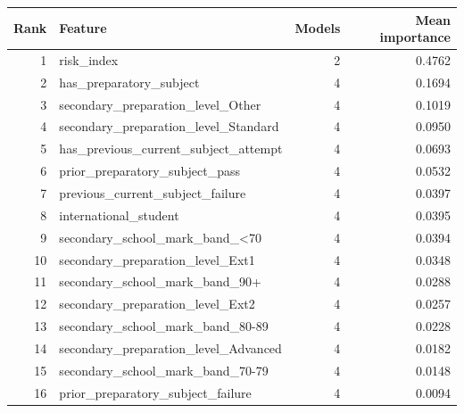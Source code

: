 \begin{tabular}{rlrr}
\toprule
Rank & Feature & Models & Mean importance \\
\midrule
1 & risk\_index & 2 & 0.4762 \\
2 & has\_preparatory\_subject & 4 & 0.1694 \\
3 & secondary\_preparation\_level\_Other & 4 & 0.1019 \\
4 & secondary\_preparation\_level\_Standard & 4 & 0.0950 \\
5 & has\_previous\_current\_subject\_attempt & 4 & 0.0693 \\
6 & prior\_preparatory\_subject\_pass & 4 & 0.0532 \\
7 & previous\_current\_subject\_failure & 4 & 0.0397 \\
8 & international\_student & 4 & 0.0395 \\
9 & secondary\_school\_mark\_band\_<70 & 4 & 0.0394 \\
10 & secondary\_preparation\_level\_Ext1 & 4 & 0.0348 \\
11 & secondary\_school\_mark\_band\_90+ & 4 & 0.0288 \\
12 & secondary\_preparation\_level\_Ext2 & 4 & 0.0257 \\
13 & secondary\_school\_mark\_band\_80-89 & 4 & 0.0228 \\
14 & secondary\_preparation\_level\_Advanced & 4 & 0.0182 \\
15 & secondary\_school\_mark\_band\_70-79 & 4 & 0.0148 \\
16 & prior\_preparatory\_subject\_failure & 4 & 0.0094 \\
\bottomrule
\end{tabular}
